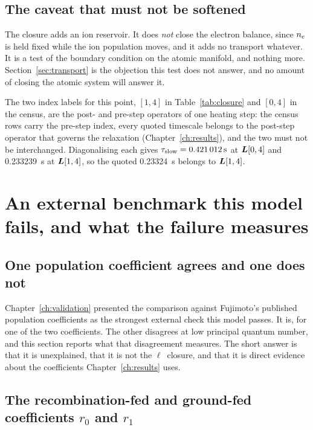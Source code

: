 \subsection{The caveat that must not be softened}

The closure adds an ion reservoir. It does \emph{not} close the electron
balance, since $n_e$ is held fixed while the ion population moves, and it adds
no transport whatever. It is a test of the boundary condition on the atomic
manifold, and nothing more. Section~\ref{sec:transport} is the objection this
test does not answer, and no amount of closing the atomic system will answer it.

The two index labels for this point, $[1,4]$ in Table~\ref{tab:closure} and
$[0,4]$ in the census, are the post- and pre-step operators of one heating
step: the census rows carry the pre-step index, every quoted timescale belongs
to the post-step operator that governs the relaxation (Chapter~\ref{ch:results}),
and the two must not be interchanged. Diagonalising each gives
$\tau_{\mathrm{slow}} = \SI{0.421012}{\second}$ at $\bm{L}[0,4]$ and
\SI{0.233239}{\second} at $\bm{L}[1,4]$, so the quoted \SI{0.23324}{\second}
belongs to $\bm{L}[1,4]$.

\section{An external benchmark this model fails, and what the failure measures}
\label{sec:r1_deficit}

\subsection{One population coefficient agrees and one does not}

Chapter~\ref{ch:validation} presented the comparison against Fujimoto's
published population coefficients as the strongest external check this model
passes. It is, for one of the two coefficients. The other disagrees at low
principal quantum number, and this section reports what that disagreement
measures. The short answer is that it is unexplained, that it is not the
$\ell$~closure, and that it is direct evidence about the coefficients
Chapter~\ref{ch:results} uses.

\subsection{The recombination-fed and ground-fed coefficients $r_0$ and $r_1$}


